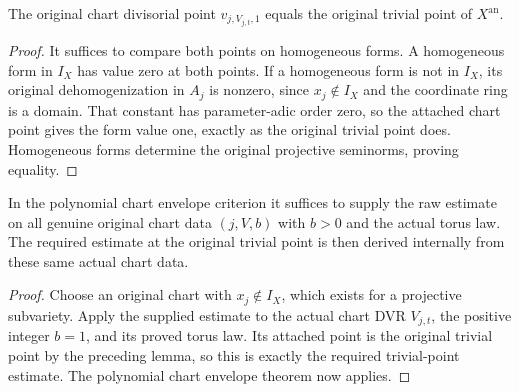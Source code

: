 \begin{lemma}
\label{lem:c0n-chart-parameter-adic-trivial-point}
\leanok
The original chart divisorial point $v_{j,V_{j,t},1}$ equals the original
trivial point of $X^{\mathrm{an}}$.
\end{lemma}
\begin{proof}
It suffices to compare both points on homogeneous forms.
A homogeneous form in $I_X$ has value zero at both points.
If a homogeneous form is not in $I_X$, its original dehomogenization in
$A_j$ is nonzero, since $x_j\notin I_X$ and the coordinate ring is a
domain.  That constant has parameter-adic order zero, so the attached
chart point gives the form value one, exactly as the original trivial
point does.  Homogeneous forms determine the original projective
seminorms, proving equality.
\end{proof}

\begin{theorem}
\label{thm:c0n-envelope-only-chart-estimates}
\leanok
In the polynomial chart envelope criterion it suffices to supply the raw
estimate on all genuine original chart data $(j,V,b)$ with $b>0$ and the
actual torus law.  The required estimate at the original trivial point
is then derived internally from these same actual chart data.
\end{theorem}
\begin{proof}
Choose an original chart with $x_j\notin I_X$, which exists for a
projective subvariety.  Apply the supplied estimate to the actual chart
DVR $V_{j,t}$, the positive integer $b=1$, and its proved torus law.
Its attached point is the original trivial point by the preceding lemma,
so this is exactly the required trivial-point estimate.
The polynomial chart envelope theorem now applies.
\end{proof}
